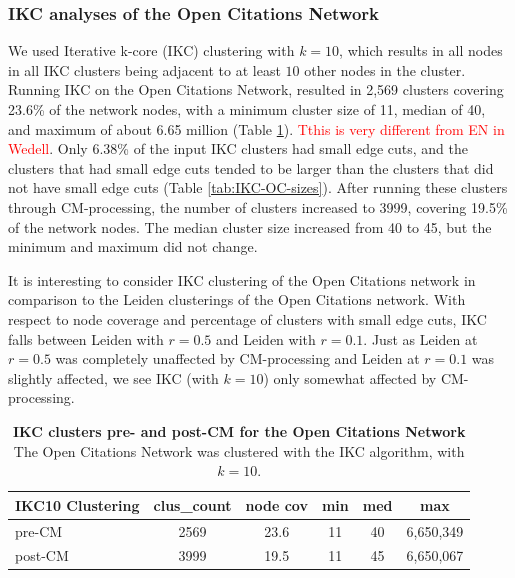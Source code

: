 \documentclass[11pt]{article}   	%
\begin{document}
\subsubsection{IKC analyses of the Open Citations Network}

We used Iterative k-core (IKC) clustering with $k=10$, which results in all nodes in all  IKC clusters being adjacent to at least $10$ other nodes in the cluster. Running IKC on the Open Citations Network, resulted in 2,569 clusters 
covering 23.6\% of the network nodes, with a minimum cluster size of 11, median of 40, and maximum of about 6.65 million (Table \ref{tab:IKC-11-OC-basicstats}). \textcolor{red}{Tthis is very different from EN in Wedell}. Only 6.38\% of the input IKC clusters had small edge cuts, and the clusters that had small edge cuts tended to be larger than the clusters that did not have small edge cuts  (Table \ref{tab:IKC-OC-sizes}).
After running these clusters through CM-processing, the number of clusters increased to 3999, covering 19.5\% of the network nodes. The  median cluster size increased from 40 to 45, but the minimum and maximum did not change.

It is interesting to consider IKC clustering of the Open Citations  network in comparison to the Leiden clusterings of the Open Citations network.
With respect to node coverage and percentage of clusters with small edge cuts, IKC falls between Leiden with $r=0.5$ and Leiden with $r=0.1$.  
Just as Leiden at $r=0.5$ was completely unaffected by CM-processing and Leiden at $r=0.1$ was slightly affected, 
we see IKC (with $k=10$) only somewhat affected by CM-processing. 




\begin{table}[ht]
\centering
\begin{tabular}{lccccc}
  \hline
  IKC10 Clustering & clus\_count & node cov & min & med & max       \\ \hline
  pre-CM     & 2569       & 23.6     & 11  & 40  & 6,650,349 \\
  post-CM & 3999 & 19.5 & 11 & 45 & 6,650,067\\
  \hline
\end{tabular}
\caption[IKC clusters pre- and post-CM for the Open Citations Network]{\textbf{IKC clusters pre- and post-CM for the Open Citations Network} The Open Citations Network was clustered with the IKC algorithm, with $k=10$.
}
\label{tab:IKC-11-OC-basicstats}
\end{table}
\end{document}
